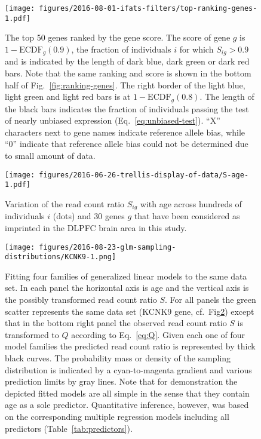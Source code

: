 \documentclass[12pt,letterpaper]{article}
\begin{document}
\begin{figure}[h]
\begin{center}
\texttt{[image: figures/2016-08-01-ifats-filters/top-ranking-genes-1.pdf]}
\caption{
The top 50 genes ranked by the gene score.  The score of gene \(g\) is \(1 -
\mathrm{ECDF}_g(0.9)\), the fraction of individuals \(i\) for which
\(S_{ig}>0.9\) and is indicated by the length of dark blue, dark green or dark
red bars.  Note that the same ranking and score is shown in the bottom half of
Fig.~\ref{fig:ranking-genes}.  The right border of the light blue, light green
and light red bars is at \(1 - \mathrm{ECDF}_g(0.8)\).  The length of the
black bars indicates the fraction of individuals passing the test of nearly
unbiased expression (Eq.~\ref{eq:unbiased-test}).  ``X'' characters next to
gene names indicate reference allele bias, while ``0'' indicate that
reference allele bias could not be determined due to small amount of data.
}
\label{fig:top-genes}
\end{center}
\end{figure}

\begin{figure}[h]
\begin{center}
\texttt{[image: figures/2016-06-26-trellis-display-of-data/S-age-1.pdf]}
\caption{
Variation of the read count ratio \(S_{ig}\) with age across hundreds of individuals
\(i\) (dots) and 30 genes \(g\) that have been considered as imprinted in the DLPFC
brain area in this study.
}
\label{fig:S-age}
\end{center}
\end{figure}

\begin{figure}[h]
\begin{center}
\texttt{[image: figures/2016-08-23-glm-sampling-distributions/KCNK9-1.png]}
\end{center}
\caption{Fitting four families of generalized linear models to the same data
set.  In each panel the horizontal axis is age and the vertical axis is the
possibly transformed read count ratio \(S\).  For all panels the green scatter
represents the same data set (KCNK9 gene, cf.~Fig\ref{fig:S-age})
except that in the bottom right panel the observed read count ratio \(S\) is
transformed to \(Q\) according to Eq.~\ref{eq:Q}.  Given each one of four model
families the predicted read count ratio is represented by thick black curves.
The probability mass or density of the sampling distribution is indicated by a
cyan-to-magenta gradient and various prediction limits by gray lines.  Note
that for demonstration the depicted fitted models are all simple in the sense
that they contain age as a sole predictor.  Quantitative inference, however,
was based on the corresponding multiple regression models including all
predictors (Table~\ref{tab:predictors}).
  }
\label{fig:predicted-curves}
\end{figure}
\end{document}

